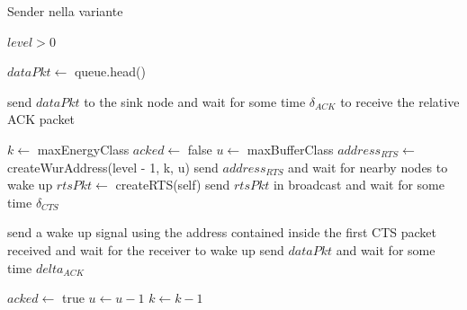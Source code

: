 \documentclass[binding=0.6cm,TFA]{sapthesis}
\begin{document}
\begin{algorithm}
    \caption{Sender nella variante}
    \begin{algorithmic}
        \REQUIRE $level > 0$

            \STATE $dataPkt \leftarrow$ queue.head()

                \STATE send $dataPkt$ to the sink node and wait for some time $\delta_{ACK}$ to receive the relative ACK packet

            \ELSE
                \STATE $k \leftarrow$ maxEnergyClass
                \STATE $acked \leftarrow$ false
                    \STATE $u \leftarrow$ maxBufferClass
                        \STATE $address_{RTS} \leftarrow$ createWurAddress(level - 1, k, u)
                        \STATE send $address_{RTS}$ and wait for nearby nodes to wake up
                        \STATE $rtsPkt \leftarrow$ createRTS(self)
                        \STATE send $rtsPkt$ in broadcast and wait for some time $\delta_{CTS}$
                        
                            \STATE send a wake up signal using the address contained inside the first CTS packet received and wait for the receiver to wake up
                            \STATE send $dataPkt$ and wait for some time $delta_{ACK}$

                                \STATE $acked \leftarrow$ true
                            \ENDIF
                        \ENDIF
                        \STATE $u \leftarrow u-1$
                    \ENDWHILE
                    \STATE $k \leftarrow k-1$
                \ENDWHILE
            \ENDIF
        
        \ENDWHILE
    \end{algorithmic}
\end{algorithm}
\end{document}
